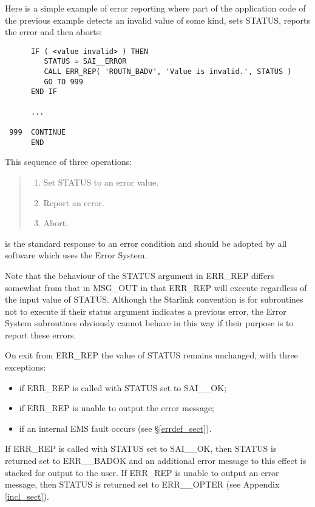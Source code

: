 Here is a simple example of error reporting where part of the application
code of the previous example detects an invalid value of some kind, sets
STATUS, reports the error and then aborts: 

\begin {small}
\begin{verbatim}
      IF ( <value invalid> ) THEN
         STATUS = SAI__ERROR
         CALL ERR_REP( 'ROUTN_BADV', 'Value is invalid.', STATUS )
         GO TO 999
      END IF

      ...

 999  CONTINUE
      END
\end{verbatim}
\end {small}

This sequence of three operations:

\begin {quote}
\begin {enumerate}
\item Set STATUS to an error value.
\item Report an error.
\item Abort.
\end {enumerate}
\end {quote}

is the standard response to an error condition and should be adopted by all
software which uses the Error System. 

Note that the behaviour of the STATUS argument in ERR\_REP differs somewhat 
from that in MSG\_OUT in that ERR\_REP will execute regardless of the input 
value of STATUS.
Although the Starlink convention is for subroutines not to execute if their
status argument indicates a previous error, the Error System subroutines
obviously cannot behave in this way if their purpose is to report these 
errors.

On exit from ERR\_REP the value of STATUS remains unchanged, with three
exceptions:

\begin{itemize}
\item if ERR\_REP is called with STATUS set to SAI\_\_OK;
\item if ERR\_REP is unable to output the error message;
\item if an internal EMS fault occurs (see \S\ref{errdef_sect}).
\end{itemize}

If ERR\_REP is called with STATUS set to SAI\_\_OK, then STATUS is returned set
to ERR\_\_BADOK and an additional error message to this effect is stacked for
output to the user.
If ERR\_REP is unable to output an error message, then STATUS is returned set to
ERR\_\_OPTER (see Appendix \ref{incl_sect}).


